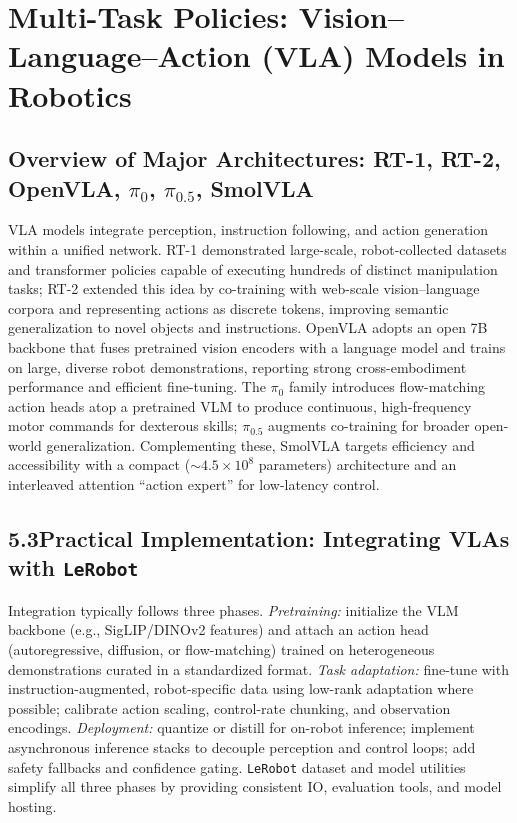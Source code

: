 \section{Multi-Task Policies: Vision–Language–Action (VLA) Models in Robotics}
\label{sec:multi}

\subsection{Overview of Major Architectures: RT-1, RT-2, OpenVLA, $\pi_0$, $\pi_{0.5}$, SmolVLA}
VLA models integrate perception, instruction following, and action generation within a unified network. RT-1 demonstrated large-scale, robot-collected datasets and transformer policies capable of executing hundreds of distinct manipulation tasks; RT-2 extended this idea by co-training with web-scale vision–language corpora and representing actions as discrete tokens, improving semantic generalization to novel objects and instructions. OpenVLA adopts an open 7B backbone that fuses pretrained vision encoders with a language model and trains on large, diverse robot demonstrations, reporting strong cross-embodiment performance and efficient fine-tuning. The $\pi_0$ family introduces flow-matching action heads atop a pretrained VLM to produce continuous, high-frequency motor commands for dexterous skills; $\pi_{0.5}$ augments co-training for broader open-world generalization. Complementing these, SmolVLA targets efficiency and accessibility with a compact (\(\sim\!4.5\times10^8\) parameters) architecture and an interleaved attention ``action expert'' for low-latency control.

\subsection*{5.3\quad Practical Implementation: Integrating VLAs with \texttt{LeRobot}}
Integration typically follows three phases. \emph{Pretraining:} initialize the VLM backbone (e.g., SigLIP/DINOv2 features) and attach an action head (autoregressive, diffusion, or flow-matching) trained on heterogeneous demonstrations curated in a standardized format. \emph{Task adaptation:} fine-tune with instruction-augmented, robot-specific data using low-rank adaptation where possible; calibrate action scaling, control-rate chunking, and observation encodings. \emph{Deployment:} quantize or distill for on-robot inference; implement asynchronous inference stacks to decouple perception and control loops; add safety fallbacks and confidence gating. \texttt{LeRobot} dataset and model utilities simplify all three phases by providing consistent IO, evaluation tools, and model hosting.

